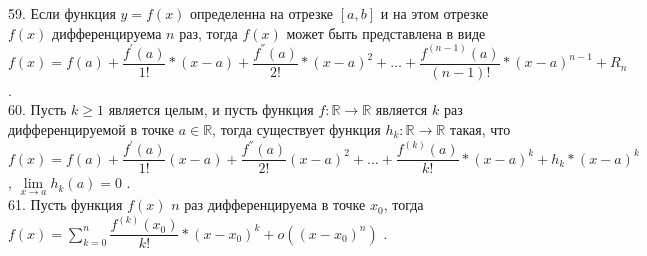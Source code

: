 \documentclass[12pt]{article}
\begin{document}
59. Если функция ${\displaystyle y=f(x)}$ определенна на отрезке ${\displaystyle [a,b]}$ и на этом отрезке ${\displaystyle f(x)}$ дифференцируема ${\displaystyle n}$ раз, тогда ${\displaystyle f(x)}$ может быть представлена в виде ${\displaystyle f(x)=f(a)+\dfrac{f^{\prime}(a)}{1!}*(x-a)+\dfrac{f^{''}(a)}{2!}*(x-a)^2+\ldots+\dfrac{f^{(n-1)}(a)}{(n-1)!}*(x-a)^{n-1}+R_n}$ .\\

60. Пусть ${\displaystyle k \geq 1}$ является целым, и пусть функция ${\displaystyle f : \mathbb{R} \rightarrow \mathbb{R}}$ является ${\displaystyle k}$ раз дифференцируемой в точке ${\displaystyle a \in \mathbb{R}}$, тогда существует функция ${\displaystyle h_k: \mathbb{R} \rightarrow \mathbb{R}}$ такая, что ${\displaystyle f(x)=f(a)+\dfrac{f^{\prime}(a)}{1!}(x-a)+\dfrac{f^{''}(a)}{2!}(x-a)^2+\ldots+\dfrac{f^{(k)}(a)}{k!}*(x-a)^k+h_k*(x-a)^k}$, ${\displaystyle \lim \limits _{x \to a} h_k(a)=0}$ .\\

61. Пусть функция ${\displaystyle f(x)}$ ${\displaystyle n}$ раз дифференцируема в точке ${\displaystyle x_0}$, тогда ${\displaystyle f(x)=\sum \limits _{k=0}^{n} \dfrac{f^{(k)}(x_0)}{k!}*(x-x_0)^k+o((x-x_0)^n)}$ .\\
\end{document}
